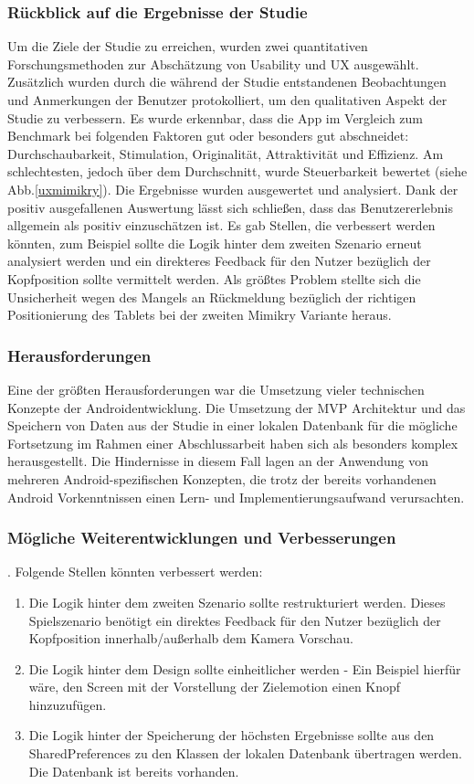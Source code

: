 \subsubsection{Rückblick auf die Ergebnisse der Studie}
Um die Ziele der Studie zu erreichen, wurden zwei quantitativen Forschungsmethoden zur Abschätzung von Usability und UX ausgewählt. Zusätzlich wurden durch die während der Studie entstandenen Beobachtungen und Anmerkungen der Benutzer protokolliert, um den qualitativen Aspekt der Studie zu verbessern.
Es wurde erkennbar, dass die App im Vergleich zum Benchmark bei folgenden Faktoren gut oder besonders gut abschneidet: Durchschaubarkeit, Stimulation, Originalität, Attraktivität und Effizienz. Am schlechtesten, jedoch über dem Durchschnitt, wurde Steuerbarkeit bewertet (siehe Abb.\ref{uxmimikry}). 
Die Ergebnisse wurden ausgewertet und analysiert. Dank der positiv ausgefallenen Auswertung lässt sich schließen, dass das Benutzererlebnis allgemein als positiv einzuschätzen ist. Es gab Stellen, die verbessert werden könnten, zum Beispiel sollte die Logik hinter dem zweiten Szenario erneut analysiert werden und ein direkteres Feedback für den Nutzer bezüglich der Kopfposition sollte vermittelt werden. Als größtes Problem stellte sich die Unsicherheit wegen des Mangels an Rückmeldung bezüglich der richtigen Positionierung des Tablets bei der zweiten Mimikry Variante heraus.

\subsubsection{Herausforderungen}
Eine der größten Herausforderungen war die Umsetzung vieler technischen Konzepte der Androidentwicklung. Die Umsetzung der MVP Architektur und das Speichern von Daten aus der Studie in einer lokalen Datenbank für die mögliche Fortsetzung im Rahmen einer Abschlussarbeit haben sich als besonders komplex herausgestellt. Die Hindernisse in diesem Fall lagen an der Anwendung von mehreren Android-spezifischen Konzepten, die trotz der bereits vorhandenen Android Vorkenntnissen einen Lern- und Implementierungsaufwand verursachten.

\subsubsection{Mögliche Weiterentwicklungen und Verbesserungen}. Folgende Stellen könnten verbessert werden:
\begin{enumerate}
    \item Die Logik hinter dem zweiten Szenario sollte restrukturiert werden. Dieses Spielszenario benötigt ein direktes Feedback für den Nutzer bezüglich der Kopfposition innerhalb/außerhalb dem Kamera Vorschau.
    \item Die Logik hinter dem Design sollte einheitlicher werden - Ein Beispiel hierfür wäre, den Screen mit der Vorstellung der Zielemotion einen Knopf hinzuzufügen.
    \item Die Logik hinter der Speicherung der höchsten Ergebnisse sollte aus den SharedPreferences zu den Klassen der lokalen Datenbank übertragen werden. Die Datenbank ist bereits vorhanden.
\end{enumerate} 


